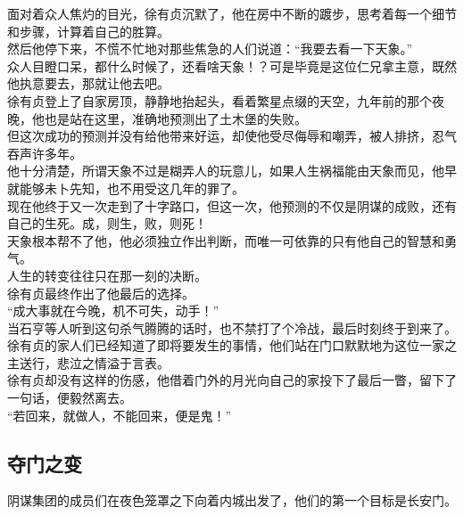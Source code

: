 \begin{multicols}{\theparacolNo}
面对着众人焦灼的目光，徐有贞沉默了，他在房中不断的踱步，思考着每一个细节和步骤，计算着自己的胜算。\\

然后他停下来，不慌不忙地对那些焦急的人们说道：“我要去看一下天象。”\\

众人目瞪口呆，都什么时候了，还看啥天象！？可是毕竟是这位仁兄拿主意，既然他执意要去，那就让他去吧。\\

徐有贞登上了自家房顶，静静地抬起头，看着繁星点缀的天空，九年前的那个夜晚，他也是站在这里，准确地预测出了土木堡的失败。\\

但这次成功的预测并没有给他带来好运，却使他受尽侮辱和嘲弄，被人排挤，忍气吞声许多年。\\

他十分清楚，所谓天象不过是糊弄人的玩意儿，如果人生祸福能由天象而见，他早就能够未卜先知，也不用受这几年的罪了。\\

现在他终于又一次走到了十字路口，但这一次，他预测的不仅是阴谋的成败，还有自己的生死。成，则生，败，则死！\\

天象根本帮不了他，他必须独立作出判断，而唯一可依靠的只有他自己的智慧和勇气。\\

人生的转变往往只在那一刻的决断。\\

徐有贞最终作出了他最后的选择。\\

“成大事就在今晚，机不可失，动手！”\\

当石亨等人听到这句杀气腾腾的话时，也不禁打了个冷战，最后时刻终于到来了。\\

徐有贞的家人们已经知道了即将要发生的事情，他们站在门口默默地为这位一家之主送行，悲泣之情溢于言表。\\

徐有贞却没有这样的伤感，他借着门外的月光向自己的家投下了最后一瞥，留下了一句话，便毅然离去。\\

“若回来，就做人，不能回来，便是鬼！”\\

\subsection{夺门之变}
阴谋集团的成员们在夜色笼罩之下向着内城出发了，他们的第一个目标是长安门。\\


\end{multicols}
